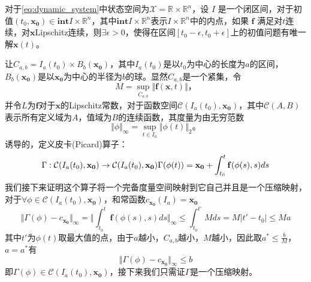 \begin{thm}\label{thm:picard_lindelof}
    对于\ref{eq:dynamic_system}中状态空间为$\mathcal{X}=\mathbb{R}\times\mathbb{R}^n$，设 \( I \) 是一个闭区间，对于初值$(t_0,\mathbf{x_0})\in \textbf{int} I\times\mathbb{R}^n$，其中$\textbf{int} I\times\mathbb{R}^n$表示$I\times\mathbb{R}^n$中的内点，如果 $\mathbf{f}$ 满足对$t$连续，对$\mathbf{x}$Lipschitz连续，则$\exists \epsilon>0$，使得在区间$[t_0-\epsilon,t_0+\epsilon]$上的初值问题有唯一解$\mathbf{x}(t)$。
\end{thm}
\begin{pf}
    让$C_{a,b}=I_a(t_0)\times B_b(\mathbf{x_0})$，其中$I_a(t_0)$是以$t_0$为中心的长度为$a$的区间，$B_b(\mathbf{x_0})$是以$\mathbf{x_0}$为中心的半径为$b$的球。显然$C_{a,b}$是一个紧集，令
    \begin{equation}
        M=\sup_{C_{a,b}}\Vert \mathbf{f}(\mathbf{x},t)\Vert，
    \end{equation}
    并令$L$为$\mathbf{f}$对于$\mathbf{x}$的Lipschitz常数，对于函数空间$\mathcal{C}(I_a(t_0),\mathbf{x_0})$，其中$\mathcal{C}(A,B)$表示所有定义域为$A$，值域为$B$的连续函数，其度量为由无穷范数
    \begin{equation*}
        \Vert\phi\Vert_{\infty}=\sup_{t\in I_a}\Vert\phi(t)\Vert_2。
    \end{equation*}
    诱导的，定义皮卡(Picard)算子：
    \begin{equation*}
        \Gamma:\mathcal{C}(I_a(t_0),\mathbf{x_0})\to \mathcal{C}(I_a(t_0),\mathbf{x_0})\\
        \Gamma(\phi(t))=\mathbf{x_0}+\int_{t_0}^t\mathbf{f}(\phi(s),s)ds
    \end{equation*}
    我们接下来证明这个算子将一个完备度量空间映射到它自己并且是一个压缩映射，对于$\forall \phi\in\mathcal{C}(I_a(t_0),\mathbf{x_0})$，和常函数$c_{\mathbf{x_0}}(I_a)=\mathbf{x_0}$
    \begin{equation*}
        \Vert \Gamma(\phi)-c_{\mathbf{x_0}}\Vert_{\infty}=\Vert\int_{t_0}^t\mathbf{f}(\phi(s),s)ds\Vert_{\infty}\leq \int_{t_0}^{t'}Mds =M|t'-t_0|\leq Ma
    \end{equation*}
    其中$t'$为$\phi(t)$取最大值的点，由于$a$越小，$C_{a,b}$越小，$M$越小，因此取$a^*\leq \frac{b}{M}$，$a=a^*$有
    \begin{equation*}
        \Vert \Gamma(\phi)-c_{\mathbf{x_0}}\Vert_{\infty}\leq b
    \end{equation*}
    即$\Gamma(\phi)\in\mathcal{C}(I_a(t_0),\mathbf{x_0})$，接下来我们只需证$\Gamma$是一个压缩映射。
    \begin{equation*}

\end{equation*}
\end{pf}
